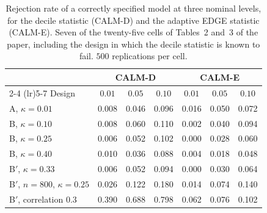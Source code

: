 \documentclass[namedate,webpdf,modern,mediumone]{oup-authoring-template}
\begin{document}
\begin{table}[!ht]
\centering
\small
\caption{Rejection rate of a correctly specified model at three nominal levels, for the decile
statistic (CALM-D) and the adaptive EDGE statistic (CALM-E). Seven of the twenty-five cells of
Tables~2 and~3 of the paper, including the design in which the decile statistic is known to fail.
$500$ replications per cell.}
\label{tab:levels}
\begin{tabular}{lcccccc}
\toprule
& \multicolumn{3}{c}{CALM-D} & \multicolumn{3}{c}{CALM-E} \\
\cmidrule(lr){2-4} \cmidrule(lr){5-7}
Design & $0.01$ & $0.05$ & $0.10$ & $0.01$ & $0.05$ & $0.10$ \\
\midrule
A, $\kappa = 0.01$ & 0.008 & 0.046 & 0.096 & 0.016 & 0.050 & 0.072 \\
B, $\kappa = 0.10$ & 0.008 & 0.060 & 0.110 & 0.002 & 0.040 & 0.094 \\
B, $\kappa = 0.25$ & 0.006 & 0.052 & 0.102 & 0.000 & 0.028 & 0.060 \\
B, $\kappa = 0.40$ & 0.010 & 0.036 & 0.088 & 0.004 & 0.018 & 0.048 \\
B$'$, $\kappa = 0.33$ & 0.006 & 0.052 & 0.094 & 0.000 & 0.030 & 0.064 \\
B$'$, $n = 800$, $\kappa = 0.25$ & 0.026 & 0.122 & 0.180 & 0.014 & 0.074 & 0.140 \\
B$'$, correlation $0.3$ & 0.390 & 0.688 & 0.798 & 0.062 & 0.076 & 0.102 \\
\bottomrule
\end{tabular}
\end{table}
\end{document}
